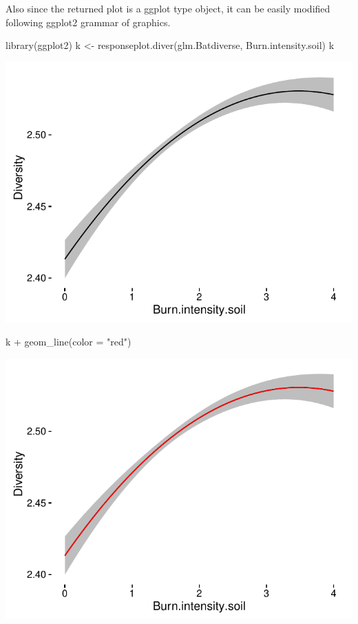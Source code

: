 \documentclass[article]{jss}
\begin{document}
Also since the returned plot is a ggplot type object, it can be easily
modified following ggplot2 grammar of graphics.

\begin{CodeChunk}
\begin{CodeInput}
library(ggplot2)
k <- responseplot.diver(glm.Batdiverse, Burn.intensity.soil)
k
\end{CodeInput}


\begin{center}\includegraphics{diversityocc_files/figure-latex/unnamed-chunk-20-1} \end{center}

\begin{CodeInput}
k + geom_line(color = "red")
\end{CodeInput}


\begin{center}\includegraphics{diversityocc_files/figure-latex/unnamed-chunk-20-2} \end{center}


\end{CodeChunk}
\end{document}
